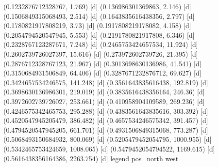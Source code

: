 {{{(0.1232876712328767, 1.769) [d] 
(0.136986301369863, 2.146) [d] 
(0.1506849315068493, 2.514) [d] 
(0.1643835616438356, 2.797) [d] 
(0.1780821917808219, 3.73) [d] 
(0.1917808219178082, 4.158) [d] 
(0.2054794520547945, 5.553) [d] 
(0.2191780821917808, 6.346) [d] 
(0.2328767123287671, 7.248) [d] 
(0.2465753424657534, 11.924) [d] 
(0.2602739726027397, 15.616) [d] 
(0.273972602739726, 21.395) [d] 
(0.2876712328767123, 21.967) [d] 
(0.3013698630136986, 41.541) [d] 
(0.3150684931506849, 64.406) [d] 
(0.3287671232876712, 69.627) [d] 
(0.3424657534246575, 141.248) [d] 
(0.3561643835616438, 192.819) [d] 
(0.3698630136986301, 219.019) [d] 
(0.3835616438356164, 246.36) [d] 
(0.3972602739726027, 253.661) [d] 
(0.410958904109589, 269.236) [d] 
(0.4246575342465753, 295.288) [d] 
(0.4383561643835616, 303.392) [d] 
(0.4520547945205479, 386.482) [d] 
(0.4657534246575342, 391.457) [d] 
(0.4794520547945205, 661.701) [d] 
(0.4931506849315068, 773.287) [d] 
(0.5068493150684932, 800.069) [d] 
(0.5205479452054795, 1000.955) [d] 
(0.5342465753424659, 1008.065) [d] 
(0.5479452054794522, 1169.615) [d] 
(0.5616438356164386, 2263.754) [d] 
}}}{legend pos=north west}